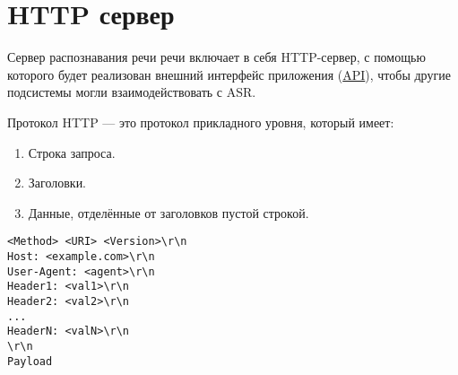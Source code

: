 \section{HTTP сервер}
Сервер распознавания речи речи включает в себя HTTP-сервер, с помощью которого
будет реализован внешний интерфейс приложения (\hyperlink{api}{API}), чтобы другие
подсистемы могли взаимодействовать с ASR.

Протокол HTTP --- это протокол прикладного уровня, который имеет:
\begin{enumerate}
    \item Строка запроса.
    \item Заголовки.
    \item Данные, отделённые от заголовков пустой строкой.
\end{enumerate}

\begin{lstlisting}[caption={Общая структура HTTP протокола}, label={lst:http:struct}]
<Method> <URI> <Version>\r\n
Host: <example.com>\r\n
User-Agent: <agent>\r\n
Header1: <val1>\r\n
Header2: <val2>\r\n
...
HeaderN: <valN>\r\n
\r\n
Payload
\end{lstlisting}

